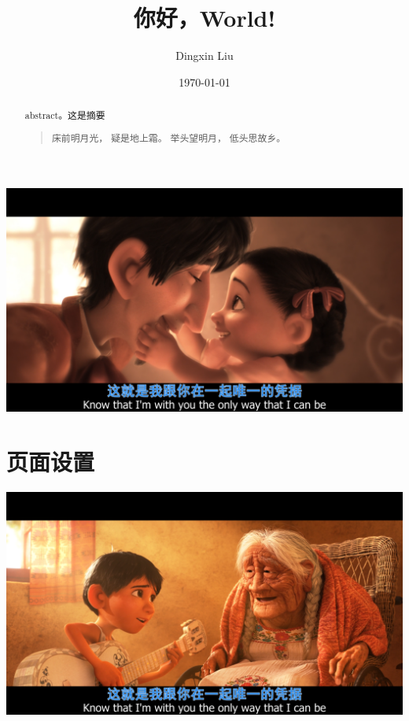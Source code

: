 \documentclass[UTF8]{ctexart}
\title{你好，World!}
\author{Dingxin Liu}
\date{\today}
\begin{document}
\begin{titlepage}
    \maketitle %
    \centering
    \includegraphics{image/coco-young.png}

\end{titlepage}


\newpage

\begin{abstract}
    abstract。这是摘要
    \begin{quote}
        \begin{center}
            {\kaishu
                床前明月光，\newline
                疑是地上霜。\newline
                举头望明月，\newline
                低头思故乡。\newline}
        \end{center}
    \end{quote}
\end{abstract}

\tableofcontents
\newpage


\section{页面设置}
\centering
\includegraphics[scale=0.5]{image/coco-old.png}
\newline
\end{document}
